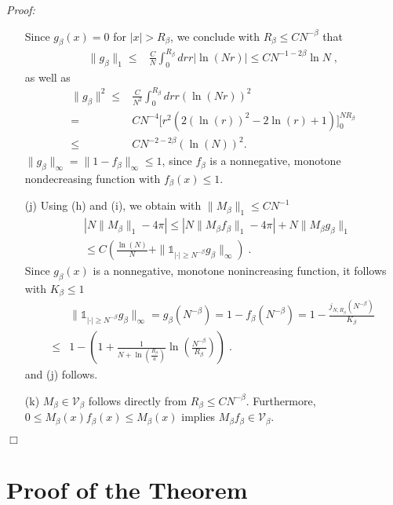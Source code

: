 \documentclass[11pt, english, american]{article}
\newenvironment{proof}{\emph{Proof:}}{\begin{flushright} $ \Box $ \end{flushright}}
\begin{document}
\begin{proof}
\begin{enumerate}
Since $g_{\beta}(x)=0$ for $\vert x\vert > R_{\beta}$, we conclude with $R_\beta \leq C N^{-\beta}$
that
\begin{align*}
\|g_{\beta}\|_1 
\leq &  
 \frac{C}{N}
 \int_{0}^{R_{\beta}}dr r 
| 
 \ln \left( N r\right)
 |
 \leq  C N^{-1-2\beta} \ln N \;,
\end{align*}
as well as
\begin{align*}
\| g_{\beta}\|^2\leq&
\frac{C}{N^2}
 \int_{0}^{R_{\beta}}  dr r
\left( \ln \left( Nr \right) \right)^2   \\
= &  CN^{-4}
 \Big[  r ^2 ( 2 (\ln(r))^2  -  2\ln (r)+1)\Big]_0^{N R_{\beta}}\\
\le &  C N^{-2-2\beta} \left(\ln (N)\right) ^2.
\end{align*}
$ \| g_{\beta}\|_\infty = \|1- f_{\beta}\|_\infty \leq 1$, since $f_\beta$ is a nonnegative, monotone nondecreasing function with $f_\beta(x) \leq 1$.

\item[(j)] Using (h) and (i), we obtain with $\| M_{\beta}\|_1 \leq CN^{-1}$
\begin{align*}
&| N \| M_{\beta}\|_1 - 4 \pi | 
\leq
| N \| M_{\beta}f_\beta\|_1 - 4 \pi | 
+
 N \| M_{\beta}g_\beta\|_1 
 \\
& \leq
 C
\left( 
  \frac{\ln(N)}{N}  +
   \|\mathds{1}_{|\cdot| \geq N^{-\beta}} g_\beta\|_\infty
  \right)
  \;.
\end{align*}
Since $g_\beta(x)$ is a nonnegative, monotone nonincreasing function, it follows with $K_\beta \leq 1$
\begin{align*}
 &  \|\mathds{1}_{|\cdot| \geq N^{-\beta}} g_\beta\|_\infty
   =
   g_\beta(N^{-\beta})=1-f_\beta(N^{-\beta})
   =
   1- \frac{j_{N,R_\beta}(N^{-\beta})}{K_\beta}
   \\
   \leq&
   1-\left( 1 +  \frac{1}{N+ \ln \left(\frac{R_\beta}{a}\right)} \ln \left( \frac{N^{- \beta}}{R_ \beta} \right)  \right)
  \;.
\end{align*}
and (j) follows.
\item[(k)]
$M_\beta \in \mathcal{V}_\beta$ follows directly from $R_\beta \leq C N^{-\beta}$.
Furthermore, $ 0 \leq M_\beta (x) f_\beta (x)  \leq M_\beta(x)$ implies
$M_\beta f_\beta \in \mathcal{V}_\beta$.
\end{enumerate}
\end{proof}






\section{Proof of the Theorem}\label{secpro}
\end{document}
